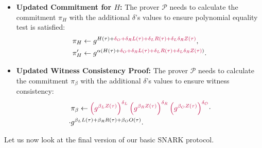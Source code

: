\documentclass[../lecture-notes.tex]{subfiles}
\begin{document}
\begin{proposition}
\begin{itemize}
        \item \textbf{Updated Commitment for $H$:} The prover $\mathcal{P}$ needs to calculate the commitment $\pi_H$ with the additional $\delta$'s values to ensure polynomial equality test is satisfied:
        \begin{equation*}
            \begin{aligned}
                & \pi_H \gets g^{H(\tau) + \textcolor{purple}{\delta_O + \delta_R L(\tau) + \delta_L R(\tau) + \delta_L \delta_R Z(\tau)}}, \\
                & \pi_H' \gets g^{\alpha(H(\tau) + \textcolor{purple}{\delta_O + \delta_R L(\tau) + \delta_L R(\tau) + \delta_L \delta_R Z(\tau)})}.
            \end{aligned}
        \end{equation*}
        \item \textbf{Updated Witness Consistency Proof:} The prover $\mathcal{P}$ needs to calculate the commitment $\pi_{\beta}$ with the additional $\delta$'s values to ensure witness consistency:
        \begin{equation*}
            \begin{aligned}
                &\pi_{\beta} \gets \textcolor{purple}{\left(g^{\beta_L Z(\tau)}\right)^{\delta_L}\left(g^{\beta_R Z(\tau)}\right)^{\delta_R}\left(g^{\beta_O Z(\tau)}\right)^{\delta_O}} \cdot \\ \cdot &g^{\beta_LL(\tau) + \beta_RR(\tau) + \beta_OO(\tau)}.            
            \end{aligned}
        \end{equation*}
    \end{itemize}
\end{proposition}

Let us now look at the final version of our basic SNARK protocol.
\end{document}
